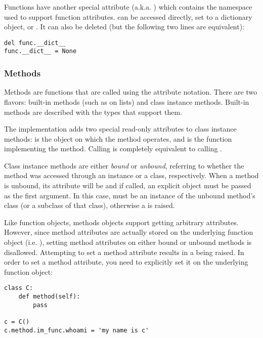 Functions have another special attribute 
(a.k.a. ) which contains the namespace used to
support function attributes.   can be accessed
directly, set to a dictionary object, or .  It can also be
deleted (but the following two lines are equivalent):

\begin{verbatim}
del func.__dict__
func.__dict__ = None
\end{verbatim}

\subsubsection{Methods \label{typesmethods}}

Methods are functions that are called using the attribute notation.
There are two flavors: built-in methods (such as  on
lists) and class instance methods.  Built-in methods are described
with the types that support them.

The implementation adds two special read-only attributes to class
instance methods:  is the object on which the
method operates, and  is the function
implementing the method.  Calling  is completely equivalent to
calling .

Class instance methods are either \emph{bound} or \emph{unbound},
referring to whether the method was accessed through an instance or a
class, respectively.  When a method is unbound, its 
attribute will be  and if called, an explicit 
object must be passed as the first argument.  In this case,
 must be an instance of the unbound method's class (or a
subclass of that class), otherwise a  is raised.

Like function objects, methods objects support getting
arbitrary attributes.  However, since method attributes are actually
stored on the underlying function object (i.e. ),
setting method attributes on either bound or unbound methods is
disallowed.  Attempting to set a method attribute results in a
 being raised.  In order to set a method attribute,
you need to explicitly set it on the underlying function object:

\begin{verbatim}
class C:
    def method(self):
        pass

c = C()
c.method.im_func.whoami = 'my name is c'
\end{verbatim}


